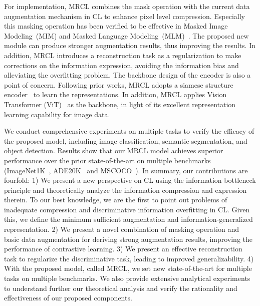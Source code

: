 \documentclass[10pt,twocolumn,letterpaper]{article}
\begin{document}
For implementation, MRCL combines the mask operation with the current data augmentation mechanism in CL to enhance pixel level compression. Especially this masking operation has been verified to be effective in Masked Image Modeling~(MIM) and Masked Language Modeling~(MLM)~\cite{he2022masked,xie2022simmim,devlin2018bert,brown2020language}. The proposed new module can produce stronger augmentation results, thus improving the results\cite{chen2020simple,bachman2019learning}. In addition, MRCL introduces a reconstruction task as a regularization to make corrections on the information expression, avoiding the information bias and alleviating the overfitting problem. The backbone design of the encoder is also a point of concern. Following prior works, MRCL adopts a siamese structure encoder~\cite{bromley1993signature,chen2020simple,grill2020bootstrap,he2020momentum,chen2020improved,chen2021empirical,zbontar2021barlow,chen2021exploring} to learn the representations. In addition, MRCL applies Vision Transformer (ViT)~\cite{dosovitskiy2020image,liu2021swin} as the backbone, in light of its excellent representation learning capability for image data.

We conduct comprehensive experiments on multiple tasks to verify the efficacy of the proposed model, including image classification, semantic segmentation, and object detection. Results show that our MRCL model achieves superior performance over the prior state-of-the-art on multiple benchmarks (ImageNet1K~\cite{deng2009imagenet}, ADE20K~\cite{zhou2019semantic} and MSCOCO~\cite{lin2014microsoft}). In summary, our contributions are fourfold: 1) We present a new perspective on CL using the information bottleneck principle and theoretically analyze the information compression and expression therein. To our best knowledge, we are the first to point out problems of inadequate compression and discriminative information overfitting in CL. Given this, we define the minimum sufficient augmentation and information-generalized representation.
2) We present a novel combination of masking operation and basic data augmentation for deriving strong augmentation results, improving the performance of contrastive learning. 
3) We present an effective reconstruction task to regularize the discriminative task, leading to improved generalizability.
4) With the proposed model, called MRCL, we set new state-of-the-art for multiple tasks on multiple benchmarks. We also provide extensive analytical experiments to understand further our theoretical analysis and verify the rationality and effectiveness of our proposed components.
\end{document}

